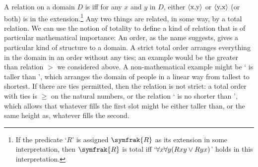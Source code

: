 A relation on a domain $D$ is  iff for any $x$ and $y$ in $D$, either $\mbox{\ensuremath{\mathopen{\langle}}x,y\ensuremath{\mathclose{\rangle}}}$ or $\mbox{\ensuremath{\mathopen{\langle}}y,x\ensuremath{\mathclose{\rangle}}}$ (or both) is in the extension.\footnote{If the predicate `$R$' is assigned $\symfrak{R}$ as its extension in some interpretation, then $\symfrak{R}$ is total iff `$\forall x \forall y (Rxy \vee Ryx)$' holds in this interpretation.} Any two things are related, in some way, by a total relation.  We can use the notion of totality to define a kind of relation that is of particular mathematical importance: 
An order, as the name suggests, gives a particular kind of structure to a domain. A strict total order arranges everything in the domain in an order without any ties; an example would be the greater than relation $>$ we considered above. A non-mathematical example might be ` is taller than ', which arranges the domain of people in a linear way from tallest to shortest. If there are ties permitted, then the relation is  not strict: a total order with ties is $≥$ on the natural numbers, or the relation ` is no shorter than ', which allows that whatever fills the first slot might be either taller than, or the same height as, whatever fills the second. 

